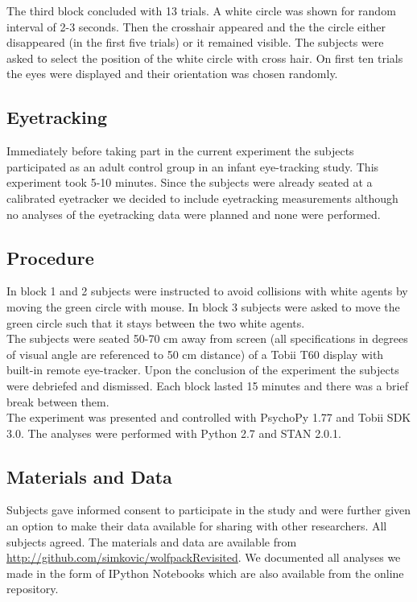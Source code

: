 \documentclass{article}
\begin{document}
The third block concluded with 13 trials. A white circle was shown for random interval of 2-3 seconds. Then the crosshair appeared and the the circle either disappeared (in the first five trials) or it remained visible. The subjects were asked to select the position of the white circle with cross hair. On first ten trials the eyes were displayed and their orientation was chosen randomly. \\
 
 
\subsection{Eyetracking}
Immediately before taking part in the current experiment the subjects participated as an adult control group in an infant eye-tracking study. 
This experiment took 5-10 minutes. 
Since the subjects were already seated at a calibrated eyetracker we decided to include eyetracking measurements although no analyses of the eyetracking data were planned and none were performed.

\subsection{Procedure}
In block 1 and 2 subjects were instructed to avoid collisions with white agents by moving the green circle with mouse. 
In block 3 subjects were asked to move the green circle such that it stays between the two white agents. \\
The subjects were seated 50-70 cm away from screen (all specifications in degrees of visual angle are referenced to 50 cm distance) of a Tobii T60 display with built-in remote eye-tracker. 
Upon the conclusion of the experiment the subjects were debriefed and dismissed. 
Each block lasted 15 minutes and there was a brief break between them.\\
The experiment was presented and controlled with PsychoPy 1.77 \citep{peirce07} and Tobii SDK 3.0. 
The analyses were performed with Python 2.7 and STAN 2.0.1.

\subsection{Materials and Data}
Subjects gave informed consent to participate in the study and were further given an option to make their data available for sharing with other researchers. 
All subjects agreed. 
The materials and data are available from \url{http://github.com/simkovic/wolfpackRevisited}. 
We  documented all analyses we made in the form of IPython Notebooks which are also available from the online repository. 
\end{document}
